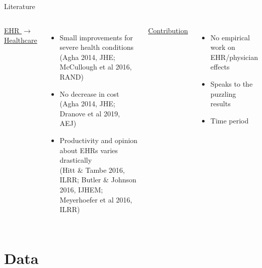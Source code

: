 \documentclass[10pt]{beamer}
\begin{document}
\begin{frame}{Literature}
\small
\begin{columns}
\setlength{\tabcolsep}{-5pt}
        \centering
        \underline{ EHR $\rightarrow$ Healthcare }
        \vspace{-1mm}
        \begin{itemize}
            \item Small improvements for severe health conditions \\ \vspace{1mm}
            \tiny(Agha 2014, JHE; McCullough et al 2016, RAND)
            
            \footnotesize
            
            \item No decrease in cost \\ \vspace{1mm}
            \tiny (Agha 2014, JHE; Dranove et al 2019, AEJ) 
            
            \footnotesize
            
            \item Productivity and opinion about EHRs varies drastically \\ \vspace{1mm}
            \tiny (Hitt $\&$ Tambe 2016, ILRR; Butler $\&$ Johnson 2016, IJHEM; Meyerhoefer et al 2016, ILRR)
        \end{itemize}
        
        \pause
        
        \centering
        \color{blue}
        \underline{ Contribution }
        \vspace{1mm}
        \begin{itemize}
        \color{blue}
            \item No empirical work on EHR/physician effects
            \item Speaks to the puzzling results
            \item Time period 
        \end{itemize}
        
        
\end{columns}

\end{frame}




\section{Data}
\end{document}
